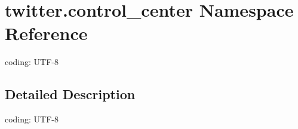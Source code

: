 \hypertarget{namespacetwitter_1_1control__center}{}\section{twitter.\+control\+\_\+center Namespace Reference}
\label{namespacetwitter_1_1control__center}


coding\+: U\+T\+F-\/8  




\subsection{Detailed Description}
coding\+: U\+T\+F-\/8 